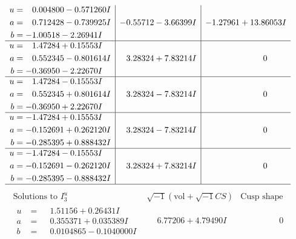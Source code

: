 \documentclass[1p]{elsarticle_modified}
\theoremstyle{definition}
\newcommand{\I}{\sqrt{-1}}
\begin{document}
$$\begin{array}{c|c|c}
\begin{aligned}
u &= \phantom{-}0.004800 - 0.571260 I \\
a &= \phantom{-}0.712428 - 0.739925 I \\
b &= -1.00518 - 2.26941 I\end{aligned}
 & -0.55712 - 3.66399 I & -1.27961 + 13.86053 I \\ \hline\begin{aligned}
u &= \phantom{-}1.47284 + 0.15553 I \\
a &= \phantom{-}0.552345 - 0.801614 I \\
b &= -0.36950 - 2.22670 I\end{aligned}
 & \phantom{-}3.28324 + 7.83214 I & \phantom{-0.000000 } 0 \\ \hline\begin{aligned}
u &= \phantom{-}1.47284 - 0.15553 I \\
a &= \phantom{-}0.552345 + 0.801614 I \\
b &= -0.36950 + 2.22670 I\end{aligned}
 & \phantom{-}3.28324 - 7.83214 I & \phantom{-0.000000 } 0 \\ \hline\begin{aligned}
u &= -1.47284 + 0.15553 I \\
a &= -0.152691 + 0.262120 I \\
b &= -0.285395 + 0.888432 I\end{aligned}
 & \phantom{-}3.28324 - 7.83214 I & \phantom{-0.000000 } 0 \\ \hline\begin{aligned}
u &= -1.47284 - 0.15553 I \\
a &= -0.152691 - 0.262120 I \\
b &= -0.285395 - 0.888432 I\end{aligned}
 & \phantom{-}3.28324 + 7.83214 I & \phantom{-0.000000 } 0\\
 \hline 
 \end{array}$$\newpage$$\begin{array}{c|c|c}  
\text{Solutions to }I^u_{3}& \I (\text{vol} + \sqrt{-1}CS) & \text{Cusp shape}\\
 \hline 
\begin{aligned}
u &= \phantom{-}1.51156 + 0.26431 I \\
a &= \phantom{-}0.355371 + 0.035389 I \\
b &= \phantom{-}0.0104865 - 0.1040000 I\end{aligned}
 & \phantom{-}6.77206 + 4.79490 I & \phantom{-0.000000 } 0 \\ \hline\begin{aligned}

\end{aligned}
\end{array}$$
\end{document}
